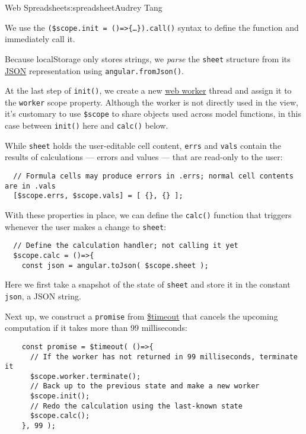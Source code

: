 \begin{aosachapter}{Web Spreadsheet}{s:spreadsheet}{Audrey Tang}
\begin{aosaitemize}
\item
  We use the
  \texttt{(\$scope.init = ()=\textgreater{}\{\ldots{}\}).call()} syntax
  to define the function and immediately call it.
\item
  Because localStorage only stores strings, we \emph{parse} the
  \texttt{sheet} structure from its
  \href{https://developer.mozilla.org/en-US/docs/Glossary/JSON}{JSON}
  representation using \texttt{angular.fromJson()}.
\item
  At the last step of \texttt{init()}, we create a new
  \href{https://developer.mozilla.org/en-US/docs/Web/API/Worker}{web
  worker} thread and assign it to the \texttt{worker} scope property.
  Although the worker is not directly used in the view, it's customary
  to use \texttt{\$scope} to share objects used across model functions,
  in this case between \texttt{init()} here and \texttt{calc()} below.
\end{aosaitemize}

While \texttt{sheet} holds the user-editable cell content, \texttt{errs}
and \texttt{vals} contain the results of calculations --- errors and
values --- that are read-only to the user:

\begin{verbatim}
  // Formula cells may produce errors in .errs; normal cell contents are in .vals
  [$scope.errs, $scope.vals] = [ {}, {} ];
\end{verbatim}

With these properties in place, we can define the \texttt{calc()}
function that triggers whenever the user makes a change to
\texttt{sheet}:

\begin{verbatim}
  // Define the calculation handler; not calling it yet
  $scope.calc = ()=>{
    const json = angular.toJson( $scope.sheet );
\end{verbatim}

Here we first take a snapshot of the state of \texttt{sheet} and store
it in the constant \texttt{json}, a JSON string.

Next up, we construct a \texttt{promise} from
\href{https://docs.angularjs.org/api/ng/service/\$timeout}{\$timeout}
that cancels the upcoming computation if it takes more than 99
milliseconds:

\begin{verbatim}
    const promise = $timeout( ()=>{
      // If the worker has not returned in 99 milliseconds, terminate it
      $scope.worker.terminate();
      // Back up to the previous state and make a new worker
      $scope.init();
      // Redo the calculation using the last-known state
      $scope.calc();
    }, 99 );
\end{verbatim}


\end{aosachapter}
